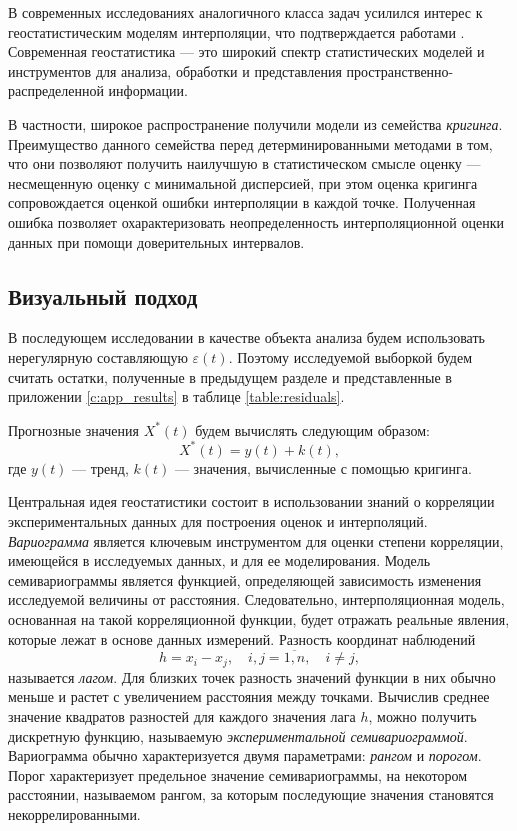 В современных исследованиях аналогичного класса задач усилился интерес к геостатистическим моделям интерполяции, что подтверждается работами \cite{GeoStCompar1987, GeoStCompar1998}. Современная геостатистика --- это широкий спектр статистических моделей и инструментов для анализа, обработки и представления пространственно-распределенной информации.

В частности, широкое распространение получили модели из семейства \textit{кригинга}. Преимущество данного семейства перед детерминированными методами в том, что они позволяют получить наилучшую в статистическом смысле оценку  --- несмещенную оценку с минимальной дисперсией, при этом оценка кригинга сопровождается оценкой ошибки интерполяции в каждой точке. Полученная ошибка позволяет охарактеризовать неопределенность интерполяционной оценки данных при помощи доверительных интервалов.

\subsection{Визуальный подход} %
\label{sec:_variogram}
В последующем исследовании в качестве объекта анализа будем использовать нерегулярную составляющую $ \varepsilon(t) $. Поэтому исследуемой выборкой будем считать остатки, полученные в предыдущем разделе и представленные в приложении \ref{c:app_results} в таблице \ref{table:residuals}.

Прогнозные значения $ X^{*}(t) $ будем вычислять следующим образом:
\begin{equation*}
	X^{*}(t) = y(t) + k(t),
\end{equation*}
где $ y(t) $ --- тренд, $ k(t) $ --- значения, вычисленные с помощью кригинга.

Центральная идея геостатистики состоит в использовании знаний о корреляции экспериментальных данных для построения оценок и интерполяций. \textit{Вариограмма} является ключевым инструментом для оценки степени корреляции, имеющейся в исследуемых данных, и для ее моделирования. Модель семивариограммы является функцией, определяющей зависимость изменения исследуемой величины от расстояния. Следовательно, интерполяционная модель, основанная на такой корреляционной функции, будет отражать реальные явления, которые лежат в основе данных измерений. Разность координат наблюдений
\begin{equation*}
	h = x_i - x_j, \quad i, j = \overline{1,n}, \quad i \neq j,
\end{equation*}
называется \textit{лагом}. Для близких точек разность значений функции в них обычно меньше и растет с увеличением расстояния между точками. Вычислив среднее значение квадратов разностей для каждого значения лага $h$, можно получить дискретную функцию, называемую \textit{экспериментальной семивариограммой}. Вариограмма обычно характеризуется двумя параметрами: \textit{рангом} и \textit{порогом}. Порог характеризует предельное значение семивариограммы, на некотором расстоянии, называемом рангом, за которым последующие значения становятся некоррелированными.

